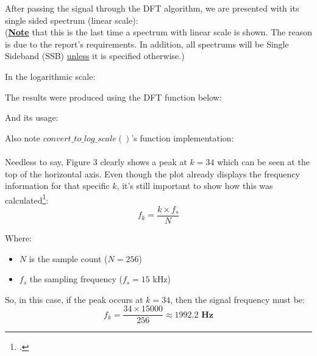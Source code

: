 After passing the signal through the DFT algorithm, we are presented with its single sided spectrum (linear scale):
\\
(\textbf{\underline{Note}} that this is the last time a spectrum with linear scale is shown. The reason is due to the report's requirements. In addition, all spectrums will be Single Sideband (SSB) \underline{unless} it is specified otherwise.)

\newpage
In the logarithmic scale:

The results were produced using the DFT function below:


\newpage
And its usage:


Also note $convert\_to\_log\_scale()$'s function implementation:


\paragraph{}
Needless to say, Figure 3 clearly shows a peak at $k = 34$ which can be seen at the top of the horizontal axis. Even though the plot already displays the frequency information for that specific $k$, it's still important to show how this was calculated\footcite{book2_pp53}:
\[f_k = \frac{k\times f_s}{N}\]

Where:
\begin{itemize}
\item $N$ is the sample count ($N = 256$)
\item $f_s$ the sampling frequency ($f_s = 15$ kHz)
\end{itemize}

So, in this case, if the peak occurs at $k = 34$, then the signal frequency must be:
\[f_k = \frac{34\times 15000}{256} \approx \mathbf{1992.2}\textbf{ Hz}\]

